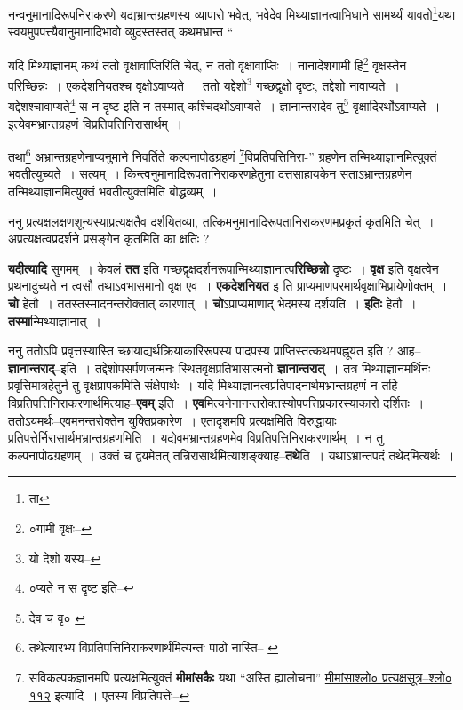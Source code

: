 \documentclass[article,12pt,a4paper]{memoir}
\begin{document}
	  \pstart नन्वनुमानादिरूपनिराकरणे यद्यभ्रान्तग्रहणस्य व्यापारो भवेत्, भवेदेव मिथ्याज्ञानत्वाभिधाने सामर्थ्यं यावतो\footnote{ता}यथा स्वयमुपपत्त्यैवानुमानादिभावो व्युदस्तस्तत् कथमभ्रान्त \leavevmode{} “
	  
	यदि मिथ्याज्ञानम् कथं ततो वृक्षावाप्तिरिति चेत्, न ततो वृक्षावाप्तिः । नानादेशगामी हि\footnote{०गामी वृक्षः--\cite{dp-msC}} वृक्षस्तेन परिच्छिन्नः । एकदेशनियतश्च वृक्षोऽवाप्यते । ततो यद्देशो\footnote{यो देशो यस्य--\cite{dp-msD-n}} गच्छद्वृक्षो दृष्टः, तद्देशो नावाप्यते । यद्देशश्चावाप्यते\footnote{०प्यते न स दृष्ट इति--\cite{dp-msC}} स न दृष्ट इति न तस्मात् कश्चिदर्थोऽवाप्यते । ज्ञानान्तरादेव तु\footnote{देव च वृ० \cite{dp-msB} \cite{dp-msD}} वृक्षादिरर्थोऽवाप्यते । इत्येवमभ्रान्तग्रहणं विप्रतिपत्तिनिरासार्थम् । 
	  
	तथा\footnote{तथेत्यारभ्य विप्रतिपत्तिनिराकरणार्थमित्यन्तः पाठो नास्ति--\cite{dp-msA} \cite{dp-edP} \cite{dp-edE} \cite{dp-edH}} अभ्रान्तग्रहणेनाप्यनुमाने निवर्तिते कल्पनापोढग्रहणं \footnote{सविकल्पकज्ञानमपि प्रत्यक्षमित्युक्तं \textbf{मीमांसकैः} यथा “अस्ति ह्यालोचना” \href{http://http://sarit.indology.info/?cref=śv-pratyakṣa.112}{मीमांसाश्लो० प्रत्यक्षसूत्र--श्लो० ११२} इत्यादि । एतस्य विप्रतिपत्तेः--\cite{dp-msD-n}}विप्रतिपत्तिनिरा-” ग्रहणेन तन्मिथ्याज्ञानमित्युक्तं भवतीत्युच्यते । सत्यम् । किन्त्वनुमानादिरूपतानिराकरणहेतुना दत्तसाहायकेन सताऽभ्रान्तग्रहणेन तन्मिथ्याज्ञानमित्युक्तं भवतीत्युक्तमिति बोद्धव्यम् ।
	\pend
      

	  \pstart ननु प्रत्यक्षलक्षणशून्यस्याप्रत्यक्षतैव दर्शयितव्या, तत्किमनुमानादिरूपतानिराकरणमप्रकृतं कृतमिति चेत् । अप्रत्यक्षत्वप्रदर्शने प्रसङ्गेन कृतमिति का क्षतिः ?
	\pend
      

	  \pstart \textbf{यदीत्यादि} सुगमम् । केवलं \textbf{तत} इति गच्छद्वृक्षदर्शनरूपान्मिथ्याज्ञानात्प\textbf{रिच्छिन्नो} दृष्टः । \textbf{वृक्ष} इति वृक्षत्वेन प्रथनादुच्यते न त्वसौ तथाऽवभासमानो वृक्ष एव । \textbf{एकदेशनियत} इ ति प्राप्यमाणपरमार्थवृक्षाभिप्रायेणोक्तम् । \textbf{चो} हेतौ । ततस्तस्मादनन्तरोक्तात् कारणात् । \textbf{चो}ऽप्राप्यमाणाद् भेदमस्य दर्शयति । \textbf{इतिः} हेतौ । \textbf{तस्मा}न्मिथ्याज्ञानात् ।
	\pend
      

	  \pstart ननु ततोऽपि प्रवृत्तस्यास्ति च्छायाद्यर्थक्रियाकारिरूपस्य पादपस्य प्राप्तिस्तत्कथमपह्नूयत इति ? आह--\textbf{ज्ञानान्तराद्}--इति । तद्देशोपसर्पणजन्मनः स्थितवृक्षप्रतिभासात्मनो \textbf{ज्ञानान्तरात्} । तत्र मिथ्याज्ञानमर्थिनः प्रवृत्तिमात्रहेतुर्न तु वृक्षप्रापकमिति संक्षेपार्थः । यदि मिथ्याज्ञानत्वप्रतिपादनार्थमभ्रान्तग्रहणं न तर्हि विप्रतिपत्तिनिराकरणार्थमित्याह--\textbf{एवम्} इति । \textbf{एव}मित्यनेनानन्तरोक्तस्योपपत्तिप्रकारस्याकारो दर्शितः । ततोऽयमर्थः--एवमनन्तरोक्तेन युक्तिप्रकारेण । एतादृशमपि प्रत्यक्षमिति विरुद्धायाः प्रतिपत्तेर्निरासार्थमभ्रान्तग्रहणमिति । यद्येवमभ्रान्तग्रहणमेव विप्रतिपत्तिनिराकरणार्थम् । न तु कल्पनापोढग्रहणम् । उक्तं च द्वयमेतत् तन्निरासार्थमित्याशङ्क्याह--\textbf{तथे}ति । यथाऽभ्रान्तपदं तथेदमित्यर्थः ।
	\pend
      
\end{document}
